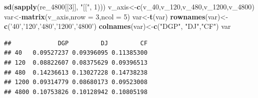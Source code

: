 \documentclass[
]{article}
\newenvironment{Shaded}{\begin{snugshade}}{\end{snugshade}}
\newcommand{\DataTypeTok}[1]{\textcolor[rgb]{0.13,0.29,0.53}{#1}}
\newcommand{\DecValTok}[1]{\textcolor[rgb]{0.00,0.00,0.81}{#1}}
\newcommand{\KeywordTok}[1]{\textcolor[rgb]{0.13,0.29,0.53}{\textbf{#1}}}
\newcommand{\NormalTok}[1]{#1}
\newcommand{\StringTok}[1]{\textcolor[rgb]{0.31,0.60,0.02}{#1}}
\begin{document}
\begin{Shaded}
\begin{Highlighting}[]
        \KeywordTok{sd}\NormalTok{(}\KeywordTok{sapply}\NormalTok{(re_}\DecValTok{4800}\NormalTok{[[}\DecValTok{3}\NormalTok{]], }\StringTok{"[["}\NormalTok{, }\DecValTok{1}\NormalTok{)))}
\NormalTok{v_axis<-}\KeywordTok{c}\NormalTok{(v_}\DecValTok{40}\NormalTok{,v_}\DecValTok{120}\NormalTok{,v_}\DecValTok{480}\NormalTok{,v_}\DecValTok{1200}\NormalTok{,v_}\DecValTok{4800}\NormalTok{)}
\NormalTok{var<-}\KeywordTok{matrix}\NormalTok{(v_axis,}\DataTypeTok{nrow =} \DecValTok{3}\NormalTok{,}\DataTypeTok{ncol =} \DecValTok{5}\NormalTok{)}
\NormalTok{var<-}\KeywordTok{t}\NormalTok{(var)}
\KeywordTok{rownames}\NormalTok{(var)<-}\KeywordTok{c}\NormalTok{(}\StringTok{'40'}\NormalTok{,}\StringTok{'120'}\NormalTok{,}\StringTok{'480'}\NormalTok{,}\StringTok{'1200'}\NormalTok{,}\StringTok{'4800'}\NormalTok{)}
\KeywordTok{colnames}\NormalTok{(var)<-}\KeywordTok{c}\NormalTok{(}\StringTok{"DGP"}\NormalTok{, }\StringTok{"DJ"}\NormalTok{,}\StringTok{"CF"}\NormalTok{)}
\NormalTok{var}
\end{Highlighting}
\end{Shaded}

\begin{verbatim}
##             DGP         DJ         CF
## 40   0.09527237 0.09396095 0.11385300
## 120  0.08822607 0.08375629 0.09396513
## 480  0.14236613 0.13027228 0.14738238
## 1200 0.09314779 0.08680173 0.09523008
## 4800 0.10753826 0.10128942 0.10805198
\end{verbatim}
\end{document}
